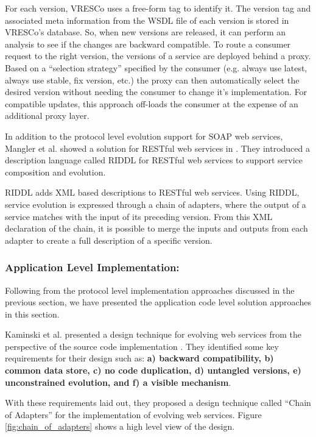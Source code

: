 \documentclass[runningheads,a4paper]{llncs}
\begin{document}
For each version, VRESCo uses a free-form tag to identify it. The version tag and associated meta information from the WSDL file of each version is stored in VRESCo's database. So, when new versions are released, it can perform an analysis to see if the changes are backward compatible. To route a consumer request to the right version, the versions of a service are deployed behind a proxy. Based on a ``selection strategy'' specified by the consumer (e.g. always use latest, always use stable, fix version, etc.) the proxy can then automatically select the desired version without needing the consumer to change it’s implementation. For compatible updates, this approach off-loads the consumer at the expense of an additional proxy layer.

In addition to the protocol level evolution support for SOAP web services, Mangler et al. showed a solution for RESTful web services in \cite{mangler2010origin}. They introduced a description language called RIDDL for RESTful web services to support service composition and evolution.

RIDDL adds XML based descriptions to RESTful web services. Using RIDDL, service evolution is expressed through a chain of adapters, where the output of a service matches with the input of its preceding version. From this XML declaration of the chain, it is possible to merge the inputs and outputs from each adapter to create a full description of a specific version.

\subsubsection{Application Level Implementation:}

Following from the protocol level implementation approaches discussed in the previous section, we have presented the application code level solution approaches in this section.

Kaminski et al. presented a design technique for evolving web services from the perspective of the source code implementation \cite{kaminski2006design}. They identified some key requirements for their design such as: \textbf{a) backward compatibility, b) common data store, c) no code duplication, d) untangled versions, e) unconstrained evolution, and f) a visible mechanism}.

With these requirements laid out, they proposed a design technique called ``Chain of Adapters'' for the implementation of evolving web services. Figure \ref{fig:chain_of_adapters} shows a high level view of the design.
\end{document}
